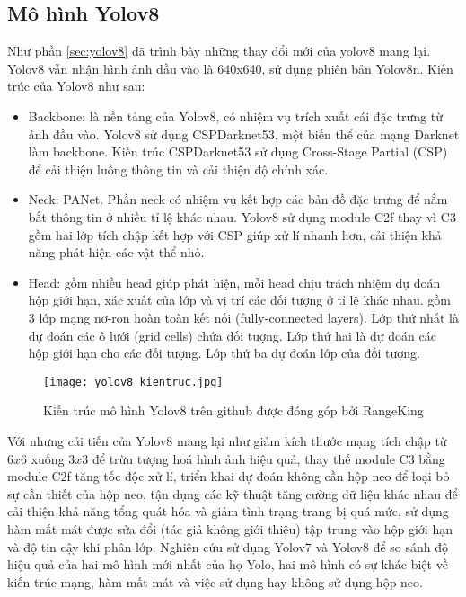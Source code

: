 \documentclass[../the.tex]{subfiles}
\begin{document}
\subsection{Mô hình Yolov8}
{\fontsize{13}{12} \selectfont 
Như phần \ref{sec:yolov8} đã trình bày những thay đổi mới của yolov8 mang lại. Yolov8 vẫn nhận hình ảnh đầu vào là 640x640, sử dụng phiên bản Yolov8n. Kiến trúc của Yolov8 như sau:
\begin{itemize}
	\item Backbone: là nền tảng của Yolov8, có nhiệm vụ trích xuất cái đặc trưng từ ảnh đầu vào. Yolov8 sử dụng CSPDarknet53, một biến thể của mạng Darknet làm backbone. 
	Kiến trúc CSPDarknet53 sử dụng Cross-Stage Partial (CSP) để cải thiện luồng thông tin và cải thiện độ chính xác.
	\item Neck: PANet. Phần neck có nhiệm vụ kết hợp các bản đồ đặc trưng để nắm bắt thông tin ở nhiều tỉ lệ khác nhau. Yolov8 sử dụng module C2f thay vì C3 gồm hai lớp tích chập kết hợp với CSP giúp xử lí nhanh hơn, cải thiện khả năng phát hiện các vật thể nhỏ.
	\item Head: gồm nhiều head giúp phát hiện, mỗi head chịu trách nhiệm dự đoán hộp giới hạn, xác xuất của lớp và vị trí các đối tượng ở tỉ lệ  khác nhau.
	gồm 3 lớp mạng nơ-ron hoàn toàn kết nối
	(fully-connected layers). Lớp thứ nhất
	là dự đoán các ô lưới (grid cells) chứa đối
	tượng. Lớp thứ hai là dự đoán các hộp giới hạn cho các đối tượng. Lớp thứ ba dự đoán lớp của đối tượng.
\end{itemize}
}

\begin{figure}[H]
	\centering
	\texttt{[image: yolov8\_kientruc.jpg]}
	\caption{Kiến trúc mô hình Yolov8 trên github được đóng góp bởi RangeKing}
	\label{fig:yolo8_kientruc}
\end{figure}

{\fontsize{13}{12} \selectfont 
Với nhưng cải tiến của Yolov8 mang lại như giảm kích thước mạng tích chập từ $6x6$ xuống $3x3$ để trừu tượng hoá hình ảnh hiệu quả, thay thế module C3 bằng module C2f tăng tốc độc xử lí, triển khai dự đoán không cần hộp neo để loại bỏ sự cần thiết của hộp neo,
tận dụng các kỹ thuật tăng cường dữ liệu khác nhau để cải thiện khả năng tổng quát hóa và giảm tình trạng trang bị quá mức, sử dụng hàm mất mát được sửa đổi (tác giả không giới thiệu) tập trung vào hộp giới hạn và độ tin cậy khi phân lớp. 
Nghiên cứu sử dụng Yolov7 và Yolov8 để so sánh độ hiệu quả của hai mô hình mới nhất của họ Yolo, hai mô hình có sự khác biệt về kiến trúc mạng, hàm mất mát và việc sử dụng hay không sử dụng hộp neo.
}
\end{document}
